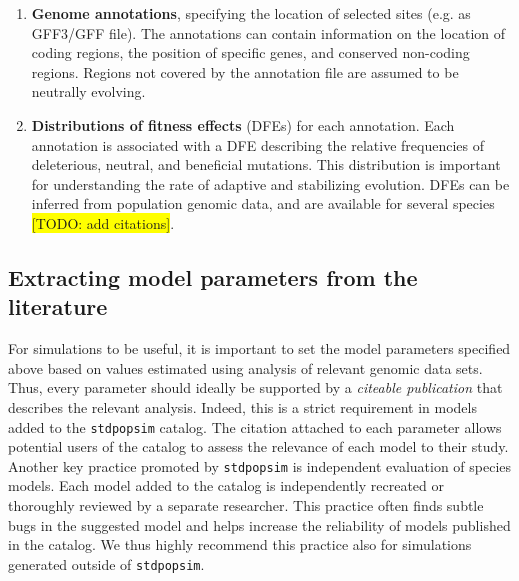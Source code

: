 \documentclass[hidelinks]{article}
\newcommand{\stdpopsim}{\texttt{stdpopsim}\xspace}
\begin{document}
\begin{enumerate}
	\def\labelenumi{\arabic{enumi}.}
	\setcounter{enumi}{5}
	\item
	\textbf{Genome annotations}, specifying the location of selected sites (e.g. as GFF3/GFF file). 
  The annotations can contain information on the location of coding regions, 
  the position of specific genes, and conserved non-coding regions. 
  Regions not covered by the annotation file are assumed to be neutrally evolving.
	\item
	\textbf{Distributions of fitness effects} (DFEs) for each annotation. 
  Each annotation is associated with a DFE describing the relative frequencies of deleterious,
  neutral, and beneficial mutations. This distribution is important for understanding
  the rate of adaptive and stabilizing evolution. DFEs can be inferred from population
  genomic data, and are available for several species \colorbox{yellow}{[TODO: add citations]}.
\end{enumerate}

\subsection*{Extracting model parameters from the literature}
%
%
For simulations to be useful, it is important to set the model parameters
specified above based on values estimated using analysis of relevant genomic data sets.
Thus, every parameter should ideally be supported by a \emph{citeable publication} that
describes the relevant analysis. 
Indeed, this is a strict requirement in models added to the \stdpopsim catalog.
The citation attached to each parameter allows potential users of the catalog to
assess the relevance of each model to their study. Another key practice promoted by \stdpopsim
is independent evaluation of species models. 
Each model added to the catalog is independently recreated or thoroughly reviewed by a separate researcher.
This practice often finds subtle bugs in the suggested model and helps increase
the reliability of models published in the catalog. 
We thus highly recommend this practice also for simulations generated outside of \stdpopsim.


\end{document}
